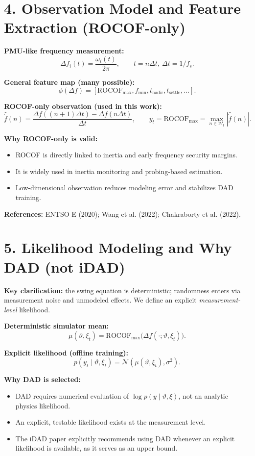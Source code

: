 \newpage
\section*{4. Observation Model and Feature Extraction (ROCOF-only)}

\textbf{PMU-like frequency measurement:}
\[
\Delta f_i(t)=\frac{\omega_i(t)}{2\pi}, \qquad t=n\Delta t,\ \Delta t=1/f_s.
\]

\textbf{General feature map (many possible):}
\[
\phi(\Delta f)=
[\mathrm{ROCOF}_{\max}, f_{\min}, t_{\text{nadir}}, t_{\text{settle}}, \dots].
\]

\textbf{ROCOF-only observation (used in this work):}
\[
\widehat{\dot f}(n)=
\frac{\Delta f((n+1)\Delta t)-\Delta f(n\Delta t)}{\Delta t},
\qquad
y_t=\mathrm{ROCOF}_{\max}=\max_{n\in\mathcal{W}_t}|\widehat{\dot f}(n)|.
\]

\textbf{Why ROCOF-only is valid:}
\begin{itemize}
\item ROCOF is directly linked to inertia and early frequency security margins.
\item It is widely used in inertia monitoring and probing-based estimation.
\item Low-dimensional observation reduces modeling error and stabilizes DAD training.
\end{itemize}

\textbf{References:}
ENTSO-E (2020); Wang et al. (2022); Chakraborty et al. (2022).

\newpage
\section*{5. Likelihood Modeling and Why DAD (not iDAD)}

\textbf{Key clarification:}
the swing equation is deterministic; randomness enters via
measurement noise and unmodeled effects.
We define an explicit \emph{measurement-level} likelihood.

\textbf{Deterministic simulator mean:}
\[
\mu(\vartheta,\xi_t)=
\mathrm{ROCOF}_{\max}\big(\Delta f(\cdot;\vartheta,\xi_t)\big).
\]

\textbf{Explicit likelihood (offline training):}
\[
p(y_t\mid \vartheta,\xi_t)=
\mathcal{N}\!\left(\mu(\vartheta,\xi_t),\sigma^2\right).
\]

\textbf{Why DAD is selected:}
\begin{itemize}
\item DAD requires numerical evaluation of $\log p(y\mid\vartheta,\xi)$,
not an analytic physics likelihood.
\item An explicit, testable likelihood exists at the measurement level.
\item The iDAD paper explicitly recommends using DAD whenever an explicit
likelihood is available, as it serves as an upper bound.
\end{itemize}


